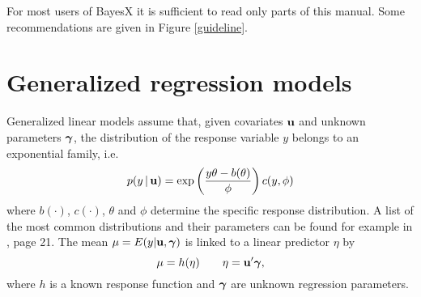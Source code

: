 \documentclass[11pt,a4paper,twoside]{bayesxarticle}
\begin{document}
For most users of BayesX it is sufficient to read only parts of this
manual. Some recommendations are given in Figure \ref{guideline}.


\section{Generalized regression models}
\label{obsmodel}

Generalized linear models assume that, given covariates $\mathbf{u}$ and
unknown parameters $\boldsymbol{\gamma}$, the distribution of the response
variable $y$ belongs to an exponential family, i.e.
\begin{equation}
\label{likel} p(y \, | \, \uvec) = \exp \left( \frac{y \theta -
b(\theta)}{\phi} \right) c(y,\phi)
\end{equation}
where $b(\cdot)$, $c(\cdot)$, $\theta$ and $\phi$ determine the specific response distribution. A list of the most common
distributions and their parameters can be found for example in , page 21. The mean
$\mu=E(y|\mathbf{u},\boldsymbol{\gamma})$ is linked to a linear predictor $\eta$ by
\begin{equation}
\label{glm} \mu=h(\eta) \qquad \eta= \uvec'\gammavec,
\end{equation}
where $h$ is a known response function and $\boldsymbol{\gamma}$ are unknown
regression parameters.
\end{document}
